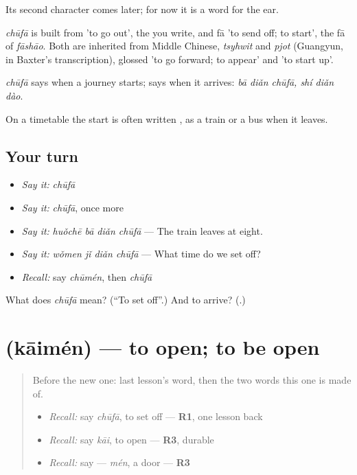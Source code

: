 Its second character comes later; for now it is a word for the ear.

\begin{cousinweb}
\emph{chūfā} is built from  'to go out', the  you write, and fā 'to send off; to start', the fā of \emph{fāshāo}. Both are inherited from Middle Chinese, \emph{tsyhwit} and \emph{pjot} (Guangyun, in Baxter's transcription), glossed 'to go forward; to appear' and 'to start up'.
\end{cousinweb}

\begin{grammarlens}[title={What you've built}]
\emph{chūfā} says when a journey starts;  says when it arrives: \emph{bā diǎn chūfā, shí diǎn dào}.

On a timetable the start is often written , as a train or a bus  when it leaves.
\end{grammarlens}

\subsection*{Your turn}
\begin{itemize}
\raggedright
  \item \emph{Say it:} \emph{chūfā}
  \item \emph{Say it:} \emph{chūfā}, once more
  \item \emph{Say it:} \emph{huǒchē bā diǎn chūfā} — The train leaves at eight.
  \item \emph{Say it:} \emph{wǒmen jǐ diǎn chūfā} — What time do we set off?
  \item \emph{Recall:} say \emph{chūmén}, then \emph{chūfā}
\end{itemize}

\begin{tcolorbox}[breakable,colback=teal!4,colframe=teal!35!black,title={Before you move on}]
What does \emph{chūfā} mean? (\textquotedblleft{}To set off\textquotedblright{}.) And to arrive? (\textbf{}.)
\end{tcolorbox}
\section[\texorpdfstring{\zh{开门} (kāimén)}{开门 (kāimén)}]{ (kāimén) — to open; to be open}

\label{lesson:ZH-C155-kaimen}



\begin{quote}
Before the new one: last lesson's word, then the two words this one is made of.

\begin{itemize}
\raggedright
  \item \emph{Recall:} say \emph{chūfā}, to set off — \textbf{R1}, one lesson back
  \item \emph{Recall:} say \emph{kāi}, to open — \textbf{R3}, durable
  \item \emph{Recall:} say  — \emph{mén}, a door — \textbf{R3}
\end{itemize}
\end{quote}

